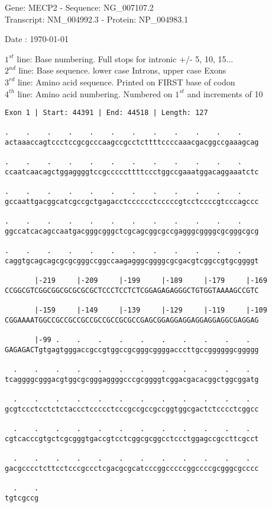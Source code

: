 \documentclass{article}
\begin{document}
\begin{center}
\begin{large}
Gene: MECP2 - Sequence: NG\_007107.2\\
Transcript: NM\_004992.3 - Protein: NP\_004983.1
 
 Date : \today
\end{large}
\end{center}
$1^{st}$ line: Base numbering. Full stops for intronic +/- 5, 10, 15...\\
$2^{nd}$ line: Base sequence. lower case Introns, upper case Exons\\
$3^{rd}$ line: Amino acid sequence. Printed on FIRST base of codon\\
$4^{th}$ line: Amino acid numbering. Numbered on $1^{st}$ and increments of 10\\
\begin{Verbatim}
Exon 1 | Start: 44391 | End: 44518 | Length: 127
 
.    .    .    .    .    .    .    .    .    .    .    .    
actaaaccagtccctccgcgcccaagccgcctcttttccccaaacgacggccgaaagcag
  
.    .    .    .    .    .    .    .    .    .    .    .    
ccaatcaacagctggaggggtccgcccccttttccctggccgaaatggacaggaaatctc
  
.    .    .    .    .    .    .    .    .    .    .    .    
gccaattgacggcatcgccgctgagacctcccccctcccccgtcctccccgtcccagccc
  
.    .    .    .    .    .    .    .    .    .    .    .    
ggccatcacagccaatgacgggcgggctcgcagcggcgccgagggcggggcgcgggcgcg
  
.    .    .    .    .    .    .    .    .    .    .    .    
caggtgcagcagcgcgcgggccggccaagagggcggggcgcgacgtcggccgtgcggggt
  
       |-219     |-209     |-199     |-189     |-179     |-169
CCGGCGTCGGCGGCGCGCGCGCTCCCTCCTCTCGGAGAGAGGGCTGTGGTAAAAGCCGTC
  
       |-159     |-149     |-139     |-129     |-119     |-109
CGGAAAATGGCCGCCGCCGCCGCCGCCGCGCCGAGCGGAGGAGGAGGAGGAGGCGAGGAG
  
       |-99 .    .    .    .    .    .    .    .    .    .  
GAGAGACTgtgagtgggaccgccgtggccgcgggcggggacccttgccggggggcggggg
  
  .    .    .    .    .    .    .    .    .    .    .    .  
tcaggggcgggacgtggcgcgggaggggcccgcggggtcggacgacacggctggcggatg
  
  .    .    .    .    .    .    .    .    .    .    .    .  
gcgtccctcctctctaccctccccctcccgccgccgccggtggcgactctcccctcggcc
  
  .    .    .    .    .    .    .    .    .    .    .    .  
cgtcacccgtgctcgcgggtgaccgtcctcggcgcggcctccctggagccgccttcgcct
  
  .    .    .    .    .    .    .    .    .    .    .    .  
gacgcccctcttcctcccgccctcgacgcgcatcccggcccccggccccgcgggcgcccc
  
  .    .
tgtcgccg
\end{Verbatim}
\end{document}
